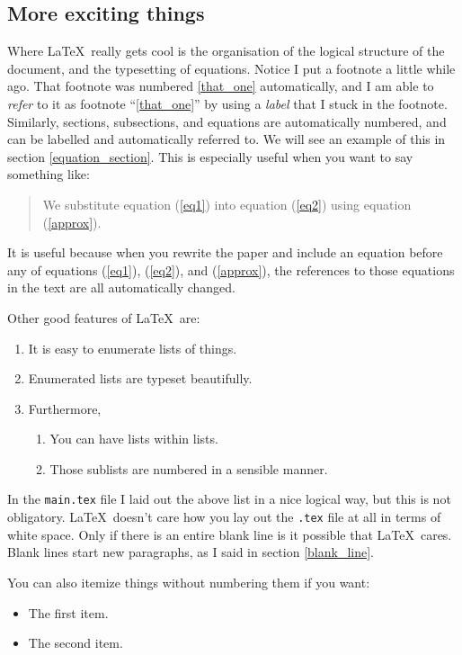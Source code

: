 \documentclass[12pt]{article}
\begin{document}
\subsection{More exciting things}
Where \LaTeX\ really gets cool is the organisation of the logical
structure of the document, and the typesetting of equations.  Notice
I put a footnote a little while ago. That footnote was numbered
\ref{that_one} automatically, and I am able to \emph{refer} to it as
footnote ``\ref{that_one}'' by using a \emph{label} that I stuck in
the footnote. Similarly, sections, subsections, and equations are
automatically numbered, and can be labelled and automatically
referred to.  We will see an example of this in section
\ref{equation_section}.  This is especially useful when you want to
say something like:

\begin{quotation}
We substitute equation (\ref{eq1}) into equation (\ref{eq2}) using
equation (\ref{approx}).
\end{quotation}

It is useful because when you rewrite the paper and include an
equation before any of equations (\ref{eq1}), (\ref{eq2}), and
(\ref{approx}), the references to those equations in the text are all
automatically changed.

 Other good features of \LaTeX\ are: 
\begin{enumerate}
\item It is easy to enumerate lists of things. 
\item Enumerated lists are typeset beautifully. 
\item Furthermore, 
\begin{enumerate}
\item You can have lists within lists.
\item Those sublists are numbered in a sensible manner.
\end{enumerate}
\end{enumerate}
In the {\tt main.tex} file I laid out the above list in a nice
logical way, but this is not obligatory. \LaTeX\ doesn't care how you
lay out the {\tt .tex} file at all in terms of white space. Only if
there is an entire blank line is it possible that \LaTeX\
cares. Blank lines start new paragraphs, as I said in section
\ref{blank_line}.

You can also itemize things without numbering them if you want:
\begin{itemize}
\item The first item. 
\item The second item. 
\end{itemize}	
\end{document}
